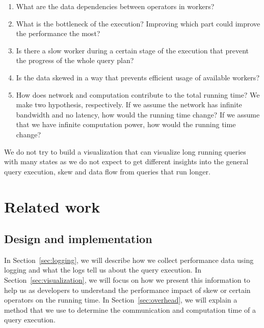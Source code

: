 \documentclass[11pt]{scrartcl}
\begin{document}
\begin{enumerate}
  \item What are the data dependencies between operators in workers?
  \item What is the bottleneck of the execution? Improving which part could improve the performance the most?
  \item Is there a slow worker during a certain stage of the execution that prevent the progress of the whole query plan?
  \item Is the data skewed in a way that prevents efficient usage of available workers?
  \item How does network and computation contribute to the total running time? We make two hypothesis, respectively. If we assume the network has infinite bandwidth and no latency, how would the running time change? If we assume that we have infinite computation power, how would the running time change?

\end{enumerate}

We do not try to build a visualization that can visualize long running queries with many states as we do not expect to get different insights into the general query execution, skew and data flow from queries that run longer.


\section{Related work}


\subsection{Design and implementation}

In Section~\ref{sec:logging}, we will describe how we collect performance data using logging and what the logs tell us about the query execution. In Section~\ref{sec:visualization}, we will focus on how we present this information to help us as developers to understand the performance impact of skew or certain operators on the running time. In Section~\ref{sec:overhead}, we will explain a method that we use to determine the communication and computation time of a query execution.
\end{document}
